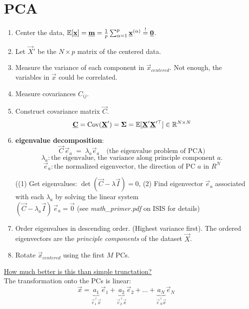 \section{PCA}

\begin{enumerate}
\item Center the data, $\mathbb{E}[\underline{\mathbf{x}}] = \underline{\mathbf{m}}  = \frac{1}{p} \sum_{\alpha=1}^{p} \underline{\mathbf{x}}^{(\alpha)}\stackrel{\mathrm{!}}{=} \underline{\mathbf{0}}$.
\item Let $\vec X'$ be the $N \times p$ matrix of the centered data.
\item Measure the variance of each component in $\vec x_{centered}$. Not enough, the variables in $\vec x$ could be correlated.
\item Measure covariances $C_{ij}$.
\item Construct covariance matrix $\vec C$.\\
$$ 
\underline{\mathbf{C}} = \text{Cov}(\underline{\mathbf{X}}') = \mathbf{\Sigma} = \mathbb{E}[\underline{\mathbf{X}}' \underline{\mathbf{X}}'^\top] \in \mathbb{R}^{N \times N}
$$
\item \textbf{eigenvalue decomposition}:\\
$$
\vec C \, \vec e_a \; = \; \lambda_a \vec e_a  \quad\text{(the eigenvalue problem of PCA)}
$$
$$
\lambda_a: \text{the eigenvalue, the variance along principle component } a.
$$
$$
\vec e_a: \text{the normalized eigenvector, the direction of PC } a \text{ in } R^N
$$

((1) Get eigenvalues: $\det(\vec C-\lambda \vec I) = 0$, 
(2) Find eigenvector $\vec e_a$ associated with each $\lambda_a$ by solving the linear system\\
$ (\vec C - \lambda_a \vec I )\, \vec e_a = \vec 0$
(see {\emph{math\_primer.pdf} on ISIS}  for details)
\item Order eigenvalues in descending order. (Highest variance first). The ordered eigenvectors are the \emph{principle components} of the dataset $\vec X$.


\item Rotate $\vec x_{centered}$ using the first $M$ PCs.
\end{enumerate}


\underline{How much better is this than simple trunctation?}\\[0.3cm]
The transformation onto the PCs is linear:
\begin{equation*}
	\vec{x} = \underbrace{ a_1 }_{ \vec{e}_1^\top \vec{x} } \vec{e}_1
		+ \underbrace{ a_2 }_{ \vec{e}_2^\top \vec{x} } \vec{e}_2
		+ \ldots
		+ \underbrace{ a_N }_{ \vec{e}_N^\top \vec{x} } \vec{e}_N
\end{equation*}

